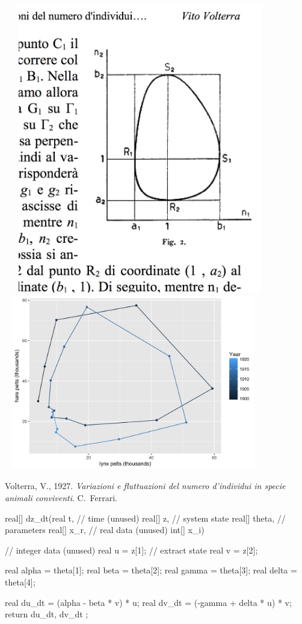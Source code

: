 \documentclass[10pt]{report}
\begin{document}
\begin{minipage}[t]{0.3\textwidth}
\mbox{ }
\vspace*{0.5in}
\mbox{ } \hfill
\includegraphics[width=0.8\textwidth]{img/volterra-orbit.jpg}
\\[-8pt]
\mbox{ }
\hfill
\includegraphics[width=0.8\textwidth]{img/hare-lynx-pelts-2.png}
\end{minipage}
\vfill
\hfill
{\tiny
Volterra, V., 1927. {\slshape Variazioni
e fluttuazioni del numero d'individui in specie animali
conviventi}. C.~Ferrari.
}

%
\vspace*{-2pt}
{\footnotesize
\begin{stancode}
  real[] dz_dt(real t,          // time (unused)
               real[] z,        // system state
               real[] theta,    // parameters
               real[] x_r,      // real data (unused)
               int[] x_i) {     // integer data (unused)
    real u = z[1];              // extract state
    real v = z[2];

    real alpha = theta[1];
    real beta = theta[2];
    real gamma = theta[3];
    real delta = theta[4];

    real du_dt = (alpha - beta * v) * u;
    real dv_dt = (-gamma + delta * u) * v;
    return { du_dt, dv_dt };
  }
\end{stancode}
}
\end{document}

